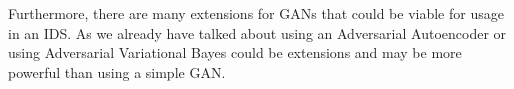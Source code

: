 \documentclass[]{article}
\begin{document}
	Furthermore, there are many extensions for GANs that could be viable for usage in an IDS. As we already have talked about using an Adversarial Autoencoder or using Adversarial Variational Bayes could be extensions and may be more powerful than using a simple GAN. 
	\newpage
	
	
\end{document}
